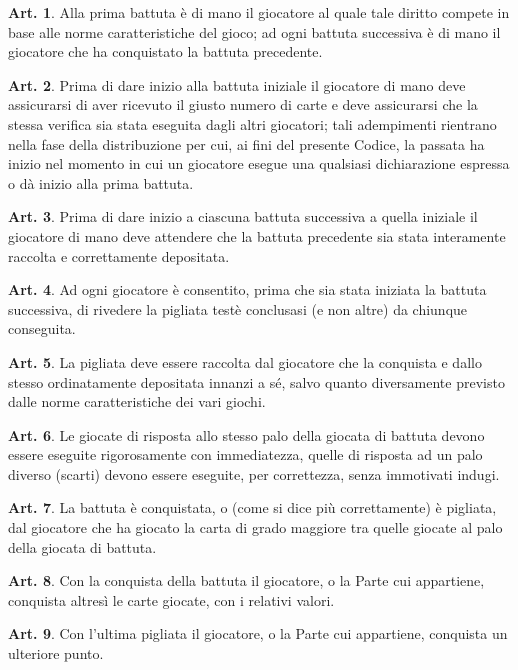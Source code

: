 \documentclass[italian,a4paper]{book}
\theoremstyle{definition}
\newtheorem{art}{Art.}
\begin{document}
\begin{art}
    Alla prima battuta è di mano il giocatore al quale tale diritto compete in base alle norme caratteristiche del gioco; ad ogni battuta successiva è di mano il giocatore che ha conquistato la battuta precedente.
\end{art}
\begin{art}
    Prima di dare inizio alla battuta iniziale il giocatore di mano deve assicurarsi di aver ricevuto il giusto numero di carte e deve assicurarsi che la stessa verifica sia stata eseguita dagli altri giocatori; tali adempimenti rientrano nella fase della distribuzione per cui, ai fini del presente Codice, la passata ha inizio nel momento in cui un giocatore esegue una qualsiasi dichiarazione espressa o dà inizio alla prima battuta.
\end{art}
\begin{art}
    Prima di dare inizio a ciascuna battuta successiva a quella iniziale il giocatore di mano deve attendere che la battuta precedente sia stata interamente raccolta e correttamente depositata.
\end{art}
\begin{art}
    Ad ogni giocatore è consentito, prima che sia stata iniziata la battuta successiva, di rivedere la pigliata testè conclusasi (e non altre) da chiunque conseguita.
\end{art}
\begin{art}
    La pigliata deve essere raccolta dal giocatore che la conquista e dallo stesso ordinatamente depositata innanzi a sé, salvo quanto diversamente previsto dalle norme caratteristiche dei vari giochi.
\end{art}
\begin{art}
    Le giocate di risposta allo stesso palo della giocata di battuta devono essere eseguite rigorosamente con immediatezza, quelle di risposta ad un palo diverso (scarti) devono essere eseguite, per correttezza, senza immotivati indugi.
\end{art}
\begin{art}
    La battuta è conquistata, o (come si dice più correttamente) è pigliata, dal giocatore che ha giocato la carta di grado maggiore tra quelle giocate al palo della giocata di battuta.
\end{art}
\begin{art}
    Con la conquista della battuta il giocatore, o la Parte cui appartiene, conquista altresì le carte giocate, con i relativi valori.
\end{art}
\begin{art}
    Con l'ultima pigliata il giocatore, o la Parte cui appartiene, conquista
    un ulteriore punto.
\end{art}
\end{document}
